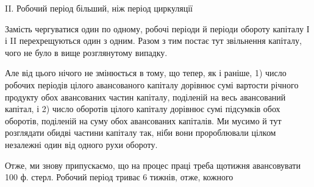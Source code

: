 II. Робочий період більший, ніж період циркуляції

Замість чергуватися один по одному, робочі періоди й періоди обороту
капіталу І і II перехрещуються один з одним. Разом з тим постає
тут звільнення капіталу, чого не було в вище розглянутому випадку.

Але від цього нічого не змінюється в тому, що тепер, як і раніше,
1) число робочих періодів цілого авансованого капіталу дорівнює сумі
вартости річного продукту обох авансованих частин капіталу, поділеній
на весь авансований капітал, і 2) число оборотів цілого капіталу дорівнює
сумі підсумків обох оборотів, поділеній на суму обох авансованих
капіталів. Ми мусимо й тут розглядати обидві частини капіталу так, ніби
вони пророблювали цілком незалежні один від одного рухи обороту.

Отже, ми знову припускаємо, що на процес праці треба щотижня
авансовувати 100 ф. стерл. Робочий період триває 6 тижнів, отже, кожного
\parbreak{}  %
